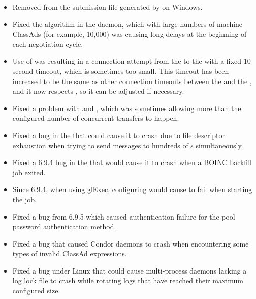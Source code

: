 \begin{itemize}
\item Removed  from the submission file
  generated by  on Windows.

\item Fixed the algorithm in the  daemon, which
  with large numbers of machine ClassAds (for example, 10,000) 
  was causing long delays at the 
  beginning of each negotiation cycle.

\item Use of  was resulting in a
  connection attempt from the  to the  with a
  fixed 10 second timeout, which is sometimes too small.  This timeout
  has been increased to be the same as other connection timeouts between
  the  and the , and it now respects
  , so it can be adjusted if necessary.

\item Fixed a problem with  and
  , which was sometimes allowing
  more than the configured number of concurrent transfers to happen.

\item Fixed a bug in the  that could cause it to crash due
  to file descriptor exhaustion when trying to send messages to hundreds of
  s simultaneously.

\item Fixed a 6.9.4 bug in the  that would cause it to crash
  when a BOINC backfill job exited.

\item Since 6.9.4, when using glExec, configuring 
  would cause  to fail when starting the job.

\item Fixed a bug from 6.9.5 which caused authentication failure for
  the pool password authentication method.

\item Fixed a bug that caused Condor daemons to crash when encountering
  some types of invalid ClassAd expressions.

\item Fixed a bug under Linux that could cause multi-process daemons
  lacking a log lock file to crash while rotating logs that have reached
  their maximum configured size.


\end{itemize}
